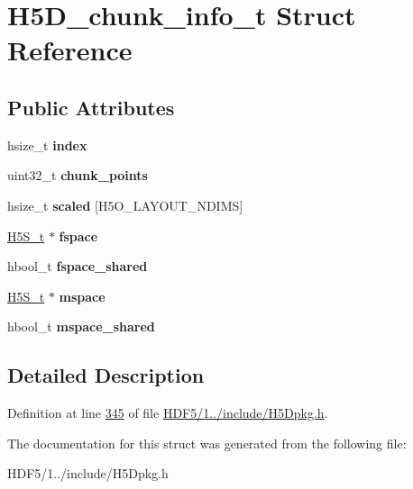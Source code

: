 \hypertarget{struct_h5_d__chunk__info__t}{}\section{H5\+D\+\_\+chunk\+\_\+info\+\_\+t Struct Reference}
\label{struct_h5_d__chunk__info__t}
\subsection*{Public Attributes}
\begin{DoxyCompactItemize}
\item 
\mbox{\label{struct_h5_d__chunk__info__t_a6dbc2da8c7336985cc059007745d1b0e}} 
hsize\+\_\+t {\bfseries index}
\item 
\mbox{\label{struct_h5_d__chunk__info__t_ad97f00550af1ac377283ff5ce8350b22}} 
uint32\+\_\+t {\bfseries chunk\+\_\+points}
\item 
\mbox{\label{struct_h5_d__chunk__info__t_a06c7e281a86e50938ab69558f50cc6ab}} 
hsize\+\_\+t {\bfseries scaled} \mbox{[}H5\+O\+\_\+\+L\+A\+Y\+O\+U\+T\+\_\+\+N\+D\+I\+MS\mbox{]}
\item 
\mbox{\label{struct_h5_d__chunk__info__t_a2d754c5e3a907b11a82ce6f314742755}} 
\hyperlink{struct_h5_s__t}{H5\+S\+\_\+t} $\ast$ {\bfseries fspace}
\item 
\mbox{\label{struct_h5_d__chunk__info__t_a3240f2ac1da08615b17d0e956c0d053a}} 
hbool\+\_\+t {\bfseries fspace\+\_\+shared}
\item 
\mbox{\label{struct_h5_d__chunk__info__t_aab164f9e857a43950e7bd8f5721f1723}} 
\hyperlink{struct_h5_s__t}{H5\+S\+\_\+t} $\ast$ {\bfseries mspace}
\item 
\mbox{\label{struct_h5_d__chunk__info__t_ad10edbdd4d484a91b3bb6a4fbf1fbba2}} 
hbool\+\_\+t {\bfseries mspace\+\_\+shared}
\end{DoxyCompactItemize}


\subsection{Detailed Description}


Definition at line \hyperlink{_h_d_f5_21_810_81_2include_2_h5_dpkg_8h_source_l00345}{345} of file \hyperlink{_h_d_f5_21_810_81_2include_2_h5_dpkg_8h_source}{H\+D\+F5/1../include/\+H5\+Dpkg.\+h}.



The documentation for this struct was generated from the following file\+:\begin{DoxyCompactItemize}
\item 
H\+D\+F5/1../include/\+H5\+Dpkg.\+h\end{DoxyCompactItemize}
